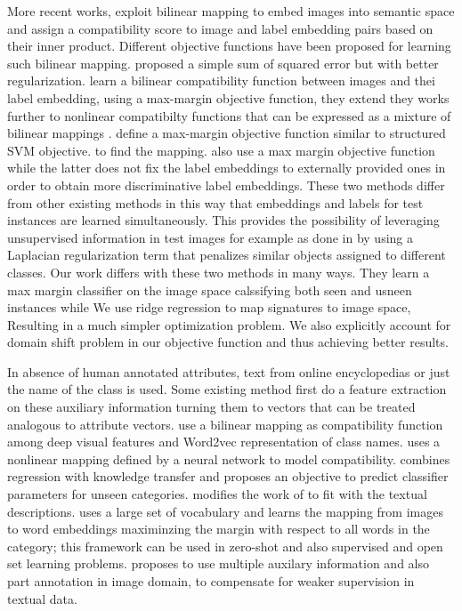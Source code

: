 More recent works, exploit bilinear mapping to embed images into semantic space and assign a compatibility score to image and label embedding
 pairs based on their inner product. Different objective functions have been proposed for learning such bilinear mapping.
 \cite{emb15} proposed a simple sum of squared error but with better regularization.
 \cite{Akata2015} learn a bilinear compatibility function between images and thei label embedding, using a max-margin objective function, they
 extend they works further to nonlinear compatibilty functions that can be expressed as a mixture of bilinear mappings \cite{Xian2016}.
\cite{li15max} define a max-margin objective function similar to structured SVM objective.
 to find the mapping. \cite{li15max, semi15} also use a max margin objective function
while the latter does not fix the label embeddings to externally provided ones in order to obtain more discriminative label embeddings. These two methods
differ from other existing methods in this way that embeddings and labels for test instances are learned simultaneously. This provides the possibility of
leveraging unsupervised information in test images for example as done in \cite{semi15} by using a Laplacian regularization term that penalizes
 similar objects assigned to different classes.
Our work differs with these two methods in many ways. They
learn a max margin classifier on the image space calssifying both seen and usneen instances while We use ridge regression to map signatures to image space, Resulting
in a much simpler optimization problem. We also explicitly account for domain shift problem in our objective function and thus achieving better results.



 In absence of human annotated attributes, text from online encyclopedias or just the name of the class is used. Some existing method
 first do a feature extraction on these auxiliary information turning them to vectors that can be treated analogous to attribute vectors.
 \cite{devise} use a bilinear mapping as compatibility function among deep visual features and Word2vec \cite{word2vec} representation of
 class names. \cite{ba2015} uses a nonlinear mapping defined by a neural network to model compatibility.
  \cite{mohamed13} combines regression with knowledge transfer and proposes an objective to predict classifier parameters
 for unseen categories. \cite{Qiao2016} modifies the work of \cite{emb15} to fit with the textual descriptions.
 \cite{Fu2016} uses a large set of vocabulary and learns the mapping from images to word embeddings maximinzing
 the margin with respect to all words in the category; this framework can be used in zero-shot and also supervised and open set learning problems.
 \cite{Akata2016} proposes to use multiple auxilary information and also  part annotation in image domain,
 to compensate for weaker supervision in textual data.


